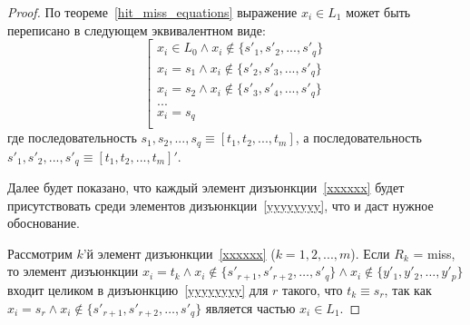 \begin{proof}
  По теореме~\ref{hit_miss_equations} выражение $x_i \in L_1$ может
  быть переписано в следующем эквивалентном виде:
  \begin{equation}
  \left[ \begin{array}{l}
  x_i \in L_0 \wedge x_i \notin \{s'_1, s'_2, ..., s'_q\}\\
  x_i = s_1 \wedge x_i \notin \{s'_2, s'_3, ..., s'_q\}\\
  x_i = s_2 \wedge x_i \notin \{s'_3, s'_4, ..., s'_q\}\\
  ...\\
  x_i = s_q\\
  \end{array} \right. \end{equation}
  где последовательность $s_1, s_2, ..., s_q \equiv [t_1, t_2, ...,
  t_m]$, а последовательность\\ $s'_1, s'_2, ..., s'_q \equiv [t_1, t_2,
  ..., t_m]'$.

  Далее будет показано, что каждый элемент дизъюнкции~\ref{xxxxxx}
  будет присутствовать среди элементов дизъюнкции~\ref{yyyyyyyy},
  что и даст нужное обоснование.

  Рассмотрим $k$'й элемент дизъюнкции~\ref{xxxxxx} ($k = 1, 2, ..., m$).
  Если $R_k$ = miss, то элемент дизъюнкции $x_i = t_k \wedge x_i
  \notin \{s'_{r+1}, s'_{r+2}, \dots, s'_q\} \wedge x_i \notin \{y'_1,
  y'_2, \dots, y'_p\}$ входит целиком в дизъюнкцию~\ref{yyyyyyyy} для
  $r$ такого, что $t_k \equiv s_r$, так как $x_i = s_r \wedge x_i
  \notin \{s'_{r+1}, s'_{r+2}, \dots, s'_q\}$ является частью $x_i
  \in L_1$.


\end{proof}

